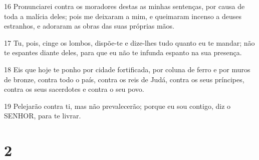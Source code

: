 \par 16 Pronunciarei contra os moradores destas as minhas sentenças, por causa de toda a malícia deles; pois me deixaram a mim, e queimaram incenso a deuses estranhos, e adoraram as obras das suas próprias mãos.
\par 17 Tu, pois, cinge os lombos, dispõe-te e dize-lhes tudo quanto eu te mandar; não te espantes diante deles, para que eu não te infunda espanto na sua presença.
\par 18 Eis que hoje te ponho por cidade fortificada, por coluna de ferro e por muros de bronze, contra todo o país, contra os reis de Judá, contra os seus príncipes, contra os seus sacerdotes e contra o seu povo.
\par 19 Pelejarão contra ti, mas não prevalecerão; porque eu sou contigo, diz o SENHOR, para te livrar.

\chapter{2}

